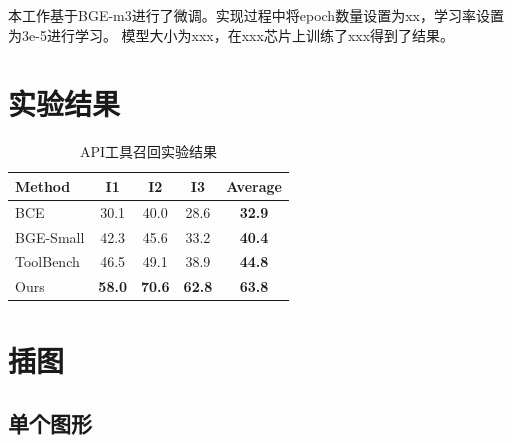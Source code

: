 本工作基于BGE-m3进行了微调。实现过程中将epoch数量设置为xx，学习率设置为3e-5进行学习。
模型大小为xxx，在xxx芯片上训练了xxx得到了结果。

\section{实验结果}



\begin{table}[!ht]
  \centering
  \caption{API工具召回实验结果}
  \label{tab:comparison}
  \begin{tabular}{lccc>{\bfseries}c} %
    \toprule
    \textbf{Method} & \textbf{I1} & \textbf{I2} & \textbf{I3} & \textbf{Average} \\ \midrule
    BCE         & 30.1 & 40.0 & 28.6 & 32.9 \\
    BGE-Small         & 42.3 & 45.6 & 33.2 & 40.4 \\
    ToolBench   & 46.5 & 49.1 & 38.9 & 44.8 \\
    Ours        & \textbf{58.0} & \textbf{70.6} & \textbf{62.8} & \textbf{63.8} \\ \bottomrule
  \end{tabular}
\end{table}

\section{插图}



\subsection{单个图形}


